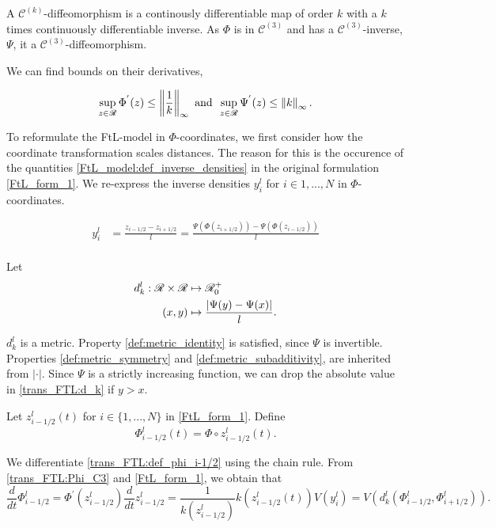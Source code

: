 A $\mathscr{C}^{(k)}$-diffeomorphism is a continously differentiable map of order $k$ with a $k$ times continuously differentiable inverse. As $\Phi$ is in $\mathscr{C}^{(3)}$ and has a $\mathscr{C}^{(3)}$-inverse, $\Psi$, it a $\mathscr{C}^{(3)}$-diffeomorphism.

We can find bounds on their derivatives,

\begin{align}\label{trans_FTL:bounds_deriv_phi_psi}
	\sup_{z \in \mathscr{R}} \Phi^{'}(z) \leq \left\lVert\frac{1}{k}\right\rVert_\infty \text{ and } \, \sup_{z \in \mathscr{R}} \Psi^{'}(z) \leq \left\lVert k\right\rVert_\infty.
\end{align}



To reformulate the FtL-model in $\Phi$-coordinates, we first consider how the coordinate transformation scales distances. The reason for this is the occurence of the quantities \eqref{FtL_model:def_inverse_densities} in the original formulation \eqref{FtL_form_1}. We re-express the inverse densities $y^l_i$ for $i \in {1,...,N}$ in $\Phi$-coordinates.

\begin{align} \label{trans_FTL:y_i_transformed}
	y^l_i &= \frac{z_{i-1/2} - z_{i+1/2}}{l} 
	= \frac{\Psi(\Phi(z_{i+1/2})) - \Psi(\Phi(z_{i-1/2}))}{l} \nonumber \\
\end{align}

Let 
\begin{align} \label{trans_FTL:d_k}
	d_k^l : \mathscr{R} \times \mathscr{R} &\mapsto \mathscr{R}^+_0 \nonumber \\ 
	(x,y)  &\mapsto \frac{|\Psi(y) - \Psi(x)|}{l}.
\end{align} 

$d_k^l$ is a metric. Property \eqref{def:metric_identity} is satisfied, since $\Psi$ is invertible. Properties \eqref{def:metric_symmetry} and \eqref{def:metric_subadditivity}, are inherited from $|\cdot|$. Since $\Psi$ is a strictly increasing function, we can drop the absolute value in \eqref{trans_FTL:d_k} if $y > x$. 

Let $z^l_{i-1/2}(t)$ for $i \in \{1,...,N\}$ in \eqref{FtL_form_1}. Define 
\begin{equation} \label{trans_FTL:def_phi_i-1/2}
	\Phi^l_{i-1/2}(t) = \Phi \circ z^l_{i-1/2} (t).
\end{equation}

We differentiate \eqref{trans_FTL:def_phi_i-1/2} using the chain rule. From \eqref{trans_FTL:Phi_C3} and \eqref{FtL_form_1}, we obtain that 
\begin{equation}
	\frac{d}{dt} \Phi_{i-1/2}^l = \Phi^{'}(z^l_{i-1/2}) \frac{d}{dt}z^l_{i-1/2} = \frac{1}{k(z^l_{i-1/2})} k(z^l_{i-1/2}(t))  V(y^l_i) = V(d_k^l(\Phi^l_{i-1/2}, \Phi^l_{i+1/2})). 
\end{equation}

